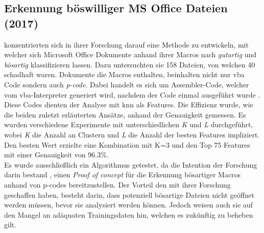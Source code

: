 \documentclass[
    12pt, %
    DIV10,
    ngerman, %
    a4paper, %
    oneside, %
    titlepage, %
    parskip=half, %
    headings=normal, %
    listof=totoc, %
    bibliography=totoc, %
    index=totoc, %
    captions=tableheading, %
    final %
]{scrreprt}
\begin{document}
%
\subsection{Erkennung böswilliger MS Office Dateien (2017)}
\textcite{Bearden2018} konzentrierten sich in ihrer Forschung darauf eine Methode zu entwickeln, mit welcher sich Microsoft Office Dokumente anhand ihrer Macros nach \emph{gutartig} und \emph{bösartig} klassifizieren lassen. Dazu untersuchten sie 158 Dateien, von welchen 40 schadhaft waren. Dokumente die Macros enthalten, beinhalten nicht nur \ac{vba} Code sondern auch \emph{p-code}. Dabei handelt es sich um Assembler-Code, welcher vom \ac{vba}-Interpreter generiert wird, nachdem der Code einmal ausgeführt wurde \parencite{Bearden2018}. Diese Codes dienten der Analyse mit \ac{knn} als Features. Die Effizienz wurde, wie die beiden zuletzt erläuterten Ansätze, anhand der Genauigkeit gemessen. Es wurden verschiedene Experimente mit unterschiedlichen \emph{K} und \emph{L} durchgeführt, wobei \emph{K} die Anzahl an Clustern und \emph{L} die Anzahl der besten Features impliziert. Den besten Wert erzielte eine Kombination mit K=3 und den Top 75 Features mit einer Genauigkeit von 96.3\%.\\Es wurde ausschlie{\ss}lich ein Algorithmus getestet, da die Intention der Forschung darin bestand , einen \emph{Proof of concept} für die Erkennung bösartiger Macros anhand von p-codes bereitzustellen. Der Vorteil den \textcite{Bearden2018} mit ihrer Forschung geschaffen haben, besteht darin, dass potenziell bösartige Dateien nicht geöffnet werden müssen, bevor sie analysiert werden können. Jedoch weisen auch sie auf den Mangel an adäquaten Trainingsdaten hin, welchen es zukünftig zu beheben gilt.
%
\end{document}
